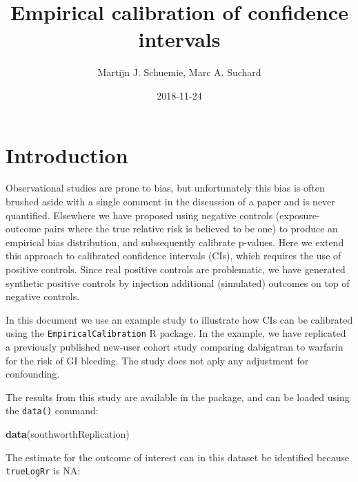 \documentclass[]{article}
\title{Empirical calibration of confidence intervals}
\author{Martijn J. Schuemie, Marc A. Suchard}
\date{2018-11-24}
\newenvironment{Shaded}{\begin{snugshade}}{\end{snugshade}}
\newcommand{\KeywordTok}[1]{\textcolor[rgb]{0.13,0.29,0.53}{\textbf{#1}}}
\newcommand{\NormalTok}[1]{#1}
\newcommand{\OperatorTok}[1]{\textcolor[rgb]{0.81,0.36,0.00}{\textbf{#1}}}
\newcommand{\StringTok}[1]{\textcolor[rgb]{0.31,0.60,0.02}{#1}}
\begin{document}
\maketitle

{
\setcounter{tocdepth}{2}
\tableofcontents
}
\hypertarget{introduction}{%
\section{Introduction}\label{introduction}}

Observational studies are prone to bias, but unfortunately this bias is
often brushed aside with a single comment in the discussion of a paper
and is never quantified. Elsewhere we have proposed using negative
controls (exposure-outcome pairs where the true relative risk is
believed to be one) to produce an empirical bias distribution, and
subsequently calibrate p-values. Here we extend this approach to
calibrated confidence intervals (CIs), which requires the use of
positive controls. Since real positive controls are problematic, we have
generated synthetic positive controls by injection additional
(simulated) outcomes on top of negative controls.

In this document we use an example study to illustrate how CIs can be
calibrated using the \texttt{EmpiricalCalibration} R package. In the
example, we have replicated a previously published new-user cohort study
comparing dabigatran to warfarin for the risk of GI bleeding. The study
does not aply any adjustment for confounding.

The results from this study are available in the package, and can be
loaded using the \texttt{data()} command:

\begin{Shaded}
\begin{Highlighting}[]
\KeywordTok{data}\NormalTok{(southworthReplication)}
\end{Highlighting}
\end{Shaded}

The estimate for the outcome of interest can in this dataset be
identified because \texttt{trueLogRr} is NA:

\begin{Shaded}
\end{Shaded}
\end{document}
